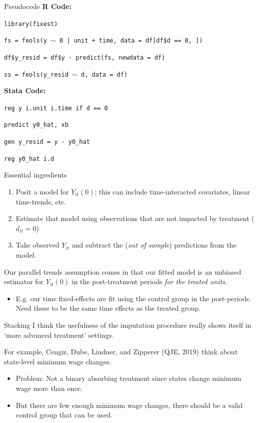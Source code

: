 \documentclass[t]{beamer}
\begin{document}
\begin{frame}{Pseudocode}
  \textbf{R Code:}
  \medskip
  
  \texttt{library(fixest)}

  \texttt{fs = feols(y $\sim$ 0 | unit + time, data = df[df\$d == 0, ])}

  \texttt{df\$y\_resid = df\$y - predict(fs, newdata = df)}

  \texttt{ss = feols(y\_resid $\sim$ d, data = df)}


  \bigskip\bigskip
  \textbf{Stata Code:}
  \medskip

  \texttt{reg y i.unit i.time if d == 0}

  \texttt{predict y0\_hat, xb}

  \texttt{gen y\_resid = y - y0\_hat}

  \texttt{reg y0\_hat i.d}
\end{frame}


\begin{frame}{Essential ingredients}
  \begin{enumerate}
    \item Posit a model for $Y_{it}(0)$; this can include time-interacted covariates, linear time-trends, etc. 
    \item Estimate that model using observations that are not impacted by treatment ($d_{it} = 0$)
    \item Take observed $Y_{it}$ and subtract the (\emph{out of sample}) predictions from the model.
  \end{enumerate}

  \pause
  \bigskip
  Our parallel trends assumption comes in that our fitted model is an unbiased estimator for $Y_{it}(0)$ in the post-treatment periods \emph{for the treated units}. 
  \begin{itemize}
    \item E.g. our time fixed-effects are fit using the control group in the post-periods. Need these to be the same time effects as the treated group.
  \end{itemize}
\end{frame}



\begin{frame}{Stacking}
  I think the usefulness of the imputation procedure really shows itself in `more advanced treatment' settings. 
  
  \bigskip
  For example, Cengiz, Dube, Lindner, and Zipperer (QJE, 2019) think about state-level minimum wage changes. 
  \begin{itemize}
    \item Problem: Not a binary absorbing treatment since states change minimum wage more than once.
    
    \item But there are few enough minimum wage changes, there should be a valid control group that can be used.
  \end{itemize}
\end{frame}
\end{document}
